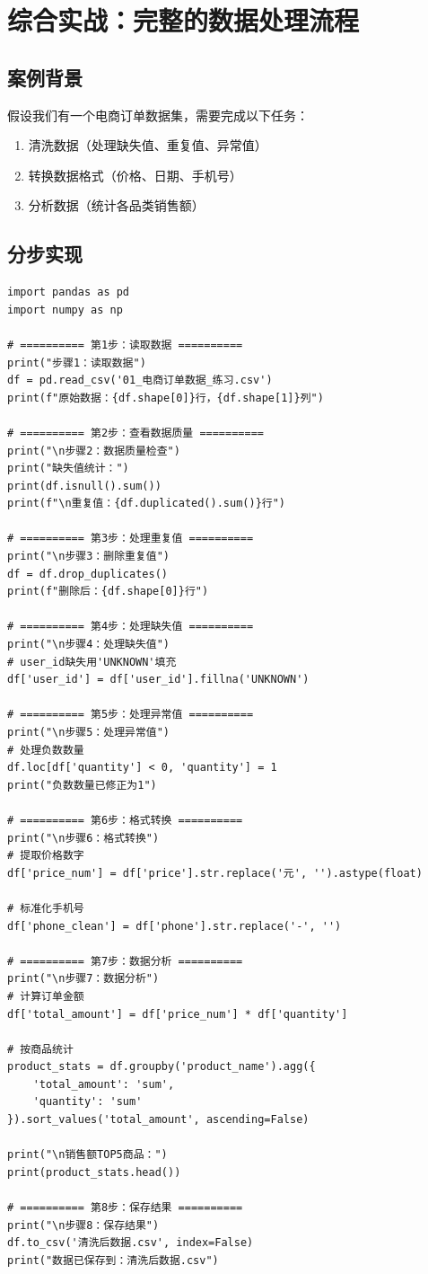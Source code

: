 \documentclass[12pt,a4paper]{article}
\begin{document}
\section{综合实战：完整的数据处理流程}

\subsection{案例背景}

假设我们有一个电商订单数据集，需要完成以下任务：
\begin{enumerate}
    \item 清洗数据（处理缺失值、重复值、异常值）
    \item 转换数据格式（价格、日期、手机号）
    \item 分析数据（统计各品类销售额）
\end{enumerate}

\subsection{分步实现}

\begin{lstlisting}[caption={完整数据处理流程}]
import pandas as pd
import numpy as np

# ========== 第1步：读取数据 ==========
print("步骤1：读取数据")
df = pd.read_csv('01_电商订单数据_练习.csv')
print(f"原始数据：{df.shape[0]}行，{df.shape[1]}列")

# ========== 第2步：查看数据质量 ==========
print("\n步骤2：数据质量检查")
print("缺失值统计：")
print(df.isnull().sum())
print(f"\n重复值：{df.duplicated().sum()}行")

# ========== 第3步：处理重复值 ==========
print("\n步骤3：删除重复值")
df = df.drop_duplicates()
print(f"删除后：{df.shape[0]}行")

# ========== 第4步：处理缺失值 ==========
print("\n步骤4：处理缺失值")
# user_id缺失用'UNKNOWN'填充
df['user_id'] = df['user_id'].fillna('UNKNOWN')

# ========== 第5步：处理异常值 ==========
print("\n步骤5：处理异常值")
# 处理负数数量
df.loc[df['quantity'] < 0, 'quantity'] = 1
print("负数数量已修正为1")

# ========== 第6步：格式转换 ==========
print("\n步骤6：格式转换")
# 提取价格数字
df['price_num'] = df['price'].str.replace('元', '').astype(float)

# 标准化手机号
df['phone_clean'] = df['phone'].str.replace('-', '')

# ========== 第7步：数据分析 ==========
print("\n步骤7：数据分析")
# 计算订单金额
df['total_amount'] = df['price_num'] * df['quantity']

# 按商品统计
product_stats = df.groupby('product_name').agg({
    'total_amount': 'sum',
    'quantity': 'sum'
}).sort_values('total_amount', ascending=False)

print("\n销售额TOP5商品：")
print(product_stats.head())

# ========== 第8步：保存结果 ==========
print("\n步骤8：保存结果")
df.to_csv('清洗后数据.csv', index=False)
print("数据已保存到：清洗后数据.csv")
\end{lstlisting}
\end{document}
